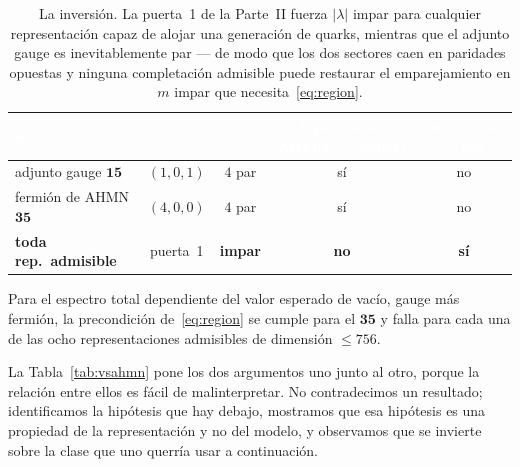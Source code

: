 \documentclass[11pt,a4paper]{article}
\newcommand{\lam}{|\lambda|}
\begin{document}
\begin{table}[t]
\centering\small
\begin{tabular}{lccc c}
\toprule
\rowcolor{hdrblue}
\textcolor{white}{sector} & \textcolor{white}{$(a,b,c)$} & \textcolor{white}{$\lam$} &
\textcolor{white}{hipótesis de AHMN ($m$ impar)} & \textcolor{white}{muesca de $m$ par}\\
\midrule
adjunto gauge $\mathbf{15}$ & $(1,0,1)$ & $4$ par & sí & no\\
\rowcolor{softgrey}
fermión de AHMN $\mathbf{35}$ & $(4,0,0)$ & $4$ par & sí & no\\
\textbf{toda rep.\ admisible} & puerta~1 & \textbf{impar} & \textbf{no} & \textbf{sí}\\
\bottomrule
\end{tabular}
\caption{La inversión. La puerta~1 de la Parte~II fuerza $\lam$ impar para cualquier
representación capaz de alojar una generación de quarks, mientras que el adjunto gauge es
inevitablemente par --- de modo que los dos sectores caen en paridades opuestas y ninguna
completación admisible puede restaurar el emparejamiento en $m$ impar que
necesita~\eqref{eq:region}.}
\label{tab:flip}
\end{table}

Para el espectro total dependiente del valor esperado de vacío, gauge más fermión, la
precondición de~\eqref{eq:region} se cumple para el $\mathbf{35}$ y falla para cada una de
las ocho representaciones admisibles de dimensión $\le756$.

La Tabla~\ref{tab:vsahmn} pone los dos argumentos uno junto al otro, porque la relación entre
ellos es fácil de malinterpretar. No contradecimos un resultado; identificamos la hipótesis que
hay debajo, mostramos que esa hipótesis es una propiedad de la representación y no del modelo,
y observamos que se invierte sobre la clase que uno querría usar a continuación.
\end{document}
